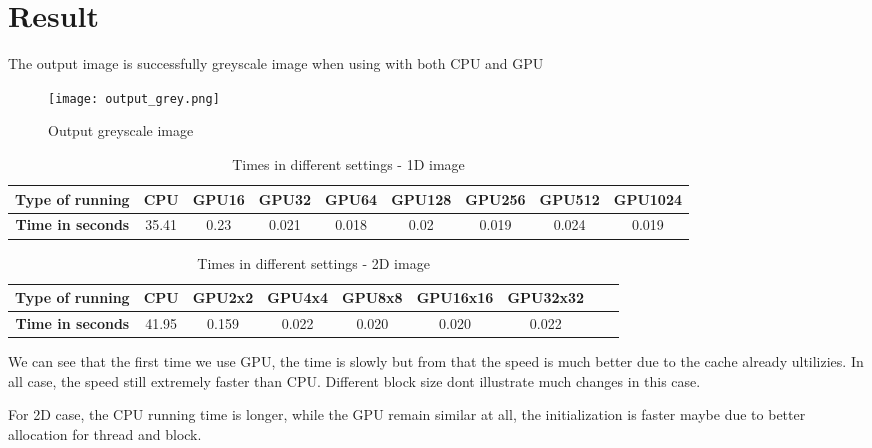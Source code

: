 \documentclass{article}
\begin{document}
\section{Result}
The output image is successfully greyscale image when using with both CPU and GPU
\begin{figure}
    \begin{center}
        \texttt{[image: output\_grey.png]}
        \caption{Output greyscale image}
    \end{center}
\end{figure}

\newpage
\begin{table}
\caption{Times in different settings - 1D image }
\begin{tabular}{|c|c|c|c|c|c|c|c|c|}
\hline
\bfseries Type of running &CPU  &GPU16  &GPU32   &GPU64   &GPU128    &GPU256   &GPU512   &GPU1024     \\
\hline\hline
\bfseries Time in seconds     &35.41   &0.23 &0.021 &0.018 &0.02 &0.019 &0.024 &0.019    \\
\hline
\end{tabular}
\end{table} 

\begin{table}
\caption{Times in different settings - 2D image }
\begin{tabular}{|c|c|c|c|c|c|c|c|c|}
\hline
\bfseries Type of running &CPU  &GPU2x2  &GPU4x4   &GPU8x8   &GPU16x16    &GPU32x32      \\
\hline\hline
\bfseries Time in seconds     &41.95   &0.159 &0.022 &0.020 &0.020 &0.022    \\
\hline
\end{tabular}
\end{table} 

We can see that the first time we use GPU, the time is slowly but from that the speed is much better due to the cache already ultilizies. In all case, the speed still extremely faster than CPU. Different block size dont illustrate much changes in this case.

For 2D case, the CPU running time is longer, while the GPU remain similar at all, the initialization is faster maybe due to better allocation for thread and block.
\end{document}
